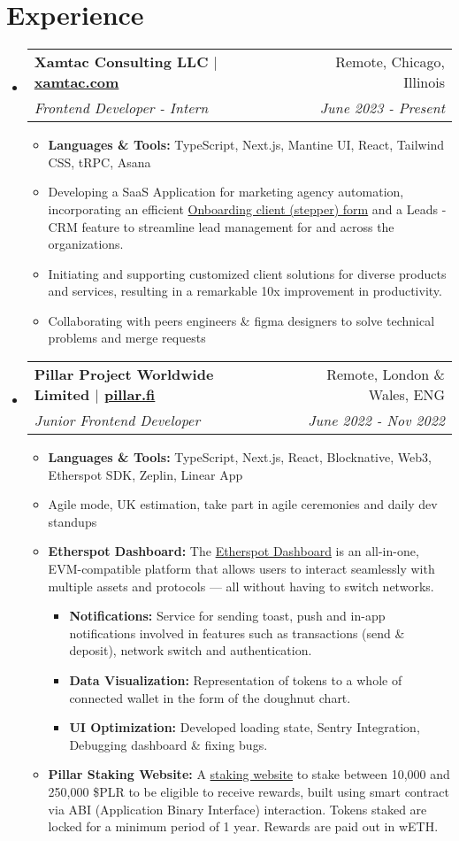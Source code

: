\documentclass[letterpaper,11pt]{article}
\makeatletter
\newcommand{\resumeItem}[2]{
  \item\small{
    \textbf{#1}{#2 \vspace{-2pt}}
  }
}
\newcommand{\resumeSubHeading}[4]{
  \vspace{-1pt}\item
    \begin{tabular*}{0.97\textwidth}{l@{\extracolsep{\fill}}r}
      \textbf{#1} & #2 \\
      \textit{\small#3} & \textit{\small #4} \\
    \end{tabular*}\vspace{-5pt}
}
\newcommand{\resumeSubHeadingListStart}{\begin{itemize}[leftmargin=*]}
\newcommand{\resumeSubHeadingListEnd}{\end{itemize}}
\newcommand{\resumeItemListStart}{\begin{itemize}}
\newcommand{\resumeItemListEnd}{\end{itemize}\vspace{-5pt}}
\makeatother
\begin{document}
\section{Experience}
\resumeSubHeadingListStart
\resumeSubHeading
{Xamtac Consulting LLC $|$ \href{https://xamtac.com}{xamtac.com}}{Remote, Chicago, Illinois}
{Frontend Developer - Intern}{June 2023 - Present}
\resumeItemListStart
\resumeItem{Languages \& Tools: }{TypeScript, Next.js, Mantine UI, React, Tailwind CSS, tRPC, Asana}
\resumeItem{}
{Developing a SaaS Application for marketing agency automation, incorporating an efficient \href{https://form-stepper.vercel.app/}{Onboarding client (stepper) form} and a Leads - CRM feature to streamline lead management for and across the organizations.}
\resumeItem{}
{Initiating and supporting customized client solutions for diverse products and services, resulting in a remarkable 10x improvement in productivity.}
\resumeItem{}
{Collaborating with peers engineers \& figma designers to solve technical problems and merge requests}
\resumeItemListEnd
\vspace{1.5pt}
\resumeSubHeading
{Pillar Project Worldwide Limited $|$ \href{https://pillar.fi}{pillar.fi}}{Remote, London \& Wales, ENG}
{Junior Frontend Developer}{June 2022 - Nov 2022}
\resumeItemListStart
\resumeItem{Languages \& Tools: }{TypeScript, Next.js, React, Blocknative, Web3, Etherspot SDK, Zeplin, Linear App}
\resumeItem{}
{Agile mode, UK estimation, take part in agile ceremonies and daily dev standups}
\resumeItem{Etherspot Dashboard: }{The \href{https://develop.etherspot.io}{Etherspot Dashboard} is an all-in-one, EVM-compatible platform that allows users to interact seamlessly with multiple assets and protocols — all without having to switch networks.}
\resumeItemListStart
\resumeItem{Notifications: }
{Service for sending toast, push and in-app notifications involved in features such as transactions (send \& deposit), network switch and authentication.}
\vspace{1.2pt}
\resumeItem{Data Visualization: }
{Representation of tokens to a whole of connected wallet in the form of the doughnut chart.}
\resumeItem{UI Optimization: }
{Developed loading state, Sentry Integration, Debugging dashboard \& fixing bugs.}
\resumeItemListEnd
\vspace{5pt}
\resumeItem{Pillar Staking Website: }{A \href{https://ui-modifications.pillar-staking-frontend.pages.dev/}{staking website} to stake between 10,000 and 250,000 \$PLR to be eligible to receive rewards, built using smart contract via ABI (Application Binary Interface) interaction. Tokens staked are locked for a minimum period of 1 year. Rewards are paid out in wETH.}
\vspace{3pt}
\resumeItemListEnd
\resumeSubHeadingListEnd
\end{document}
